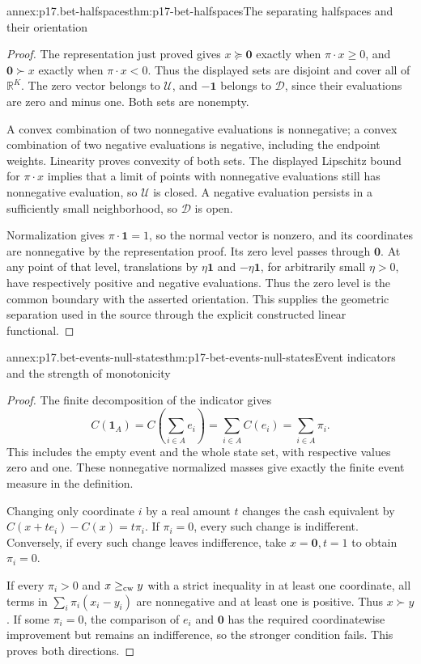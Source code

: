 \begin{annexitem}{annex:p17.bet-halfspaces}{thm:p17-bet-halfspaces}{The separating halfspaces and their orientation}
\begin{proof}
The representation just proved gives
\(x\succeq\mathbf0\) exactly when \(\pi\cdot x\geq0\),
and \(\mathbf0\succ x\) exactly when \(\pi\cdot x<0\).
Thus the displayed sets are disjoint and cover all of \(\mathbb R^K\).
The zero vector belongs to \(\mathcal U\), and
\(-\mathbf1\) belongs to \(\mathcal D\), since their evaluations
are zero and minus one. Both sets are nonempty.

A convex combination of two nonnegative evaluations is nonnegative;
a convex combination of two negative evaluations is negative,
including the endpoint weights. Linearity proves convexity of both
sets. The displayed Lipschitz bound for \(\pi\cdot x\) implies
that a limit of points with nonnegative evaluations still has
nonnegative evaluation, so \(\mathcal U\) is closed. A negative
evaluation persists in a sufficiently small neighborhood, so
\(\mathcal D\) is open.

Normalization gives \(\pi\cdot\mathbf1=1\), so the normal vector
is nonzero, and its coordinates are nonnegative by the representation
proof. Its zero level passes through \(\mathbf0\). At any point
of that level, translations by \(\eta\mathbf1\) and
\(-\eta\mathbf1\), for arbitrarily small \(\eta>0\), have
respectively positive and negative evaluations. Thus the zero level
is the common boundary with the asserted orientation. This supplies
the geometric separation used in the source through the explicit
constructed linear functional.
\end{proof}
\end{annexitem}

\begin{annexitem}{annex:p17.bet-events-null-states}{thm:p17-bet-events-null-states}{Event indicators and the strength of monotonicity}
\begin{proof}
The finite decomposition of the indicator gives
\[
            C(\mathbf1_A)=C\left(\sum_{i\in A}e_i\right)
                 =\sum_{i\in A}C(e_i)=\sum_{i\in A}\pi_i.
\]
This includes the empty event and the whole state set, with respective
values zero and one. These nonnegative normalized masses give exactly
the finite event measure in the definition.

Changing only coordinate \(i\) by a real amount \(t\) changes
the cash equivalent by \(C(x+te_i)-C(x)=t\pi_i\).
If \(\pi_i=0\), every such change is indifferent. Conversely,
if every such change leaves indifference, take \(x=\mathbf0,t=1\)
to obtain \(\pi_i=0\).

If every \(\pi_i>0\) and \(x\geq_{\rm cw}y\) with a strict
inequality in at least one coordinate, all terms in
\(\sum_i\pi_i(x_i-y_i)\) are nonnegative and at least one is
positive. Thus \(x\succ y\). If some \(\pi_i=0\), the comparison
of \(e_i\) and \(\mathbf0\) has the required coordinatewise
improvement but remains an indifference, so the stronger condition
fails. This proves both directions.
\end{proof}
\end{annexitem}

